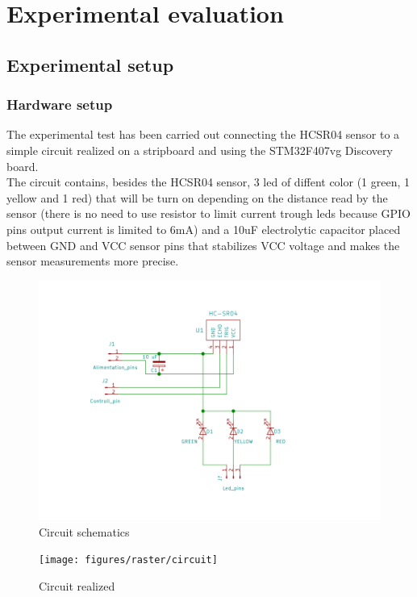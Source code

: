 \section{Experimental evaluation}


\subsection{Experimental setup}
\subsubsection{Hardware setup}
The experimental test has been carried out connecting the HCSR04 sensor to a simple circuit realized on a stripboard and using the STM32F407vg Discovery board.\\
The circuit contains, besides the HCSR04 sensor, 3 led of diffent color (1 green, 1 yellow and 1 red) that will be turn on depending on the distance read by the sensor (there is no need to use resistor to limit current trough leds because GPIO pins output current is limited to 6mA) and a 10uF electrolytic capacitor placed between GND and VCC sensor pins that stabilizes VCC voltage and makes the sensor measurements more precise.\\[2.5cm]
\begin{minipage}{0.5\textwidth}
\begin{figure}[H]
\includegraphics[width=\textwidth]{figures/raster/schematics}
\caption{\label{fig:sensor} Circuit schematics}
\end{figure}
\end{minipage}
\begin{minipage}{0.5\textwidth}
\begin{figure}[H]
\texttt{[image: figures/raster/circuit]}
\caption{\label{fig:sensor} Circuit realized}
\end{figure}
\end{minipage} \hfill
\newpage

